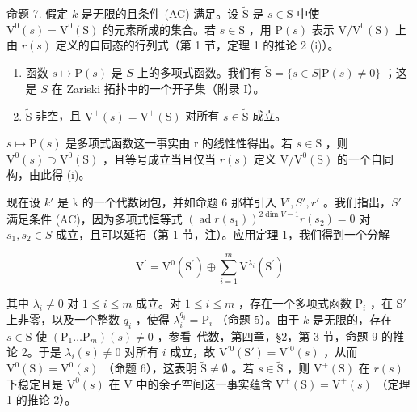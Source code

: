 命题 7. 假定 \(k\) 是无限的且条件 (AC) 满足。设 \(\tilde{\mathrm{S}}\) 是 \(s \in \mathrm{S}\) 中使 \(\mathrm{V}^0(s) = \mathrm{V}^0(\mathrm{S})\) 的元素所成的集合。若 \(s \in \mathrm{S}\) ，用 \(\mathrm{P}(s)\) 表示 \(\mathrm{V} / \mathrm{V}^0(\mathrm{S})\) 上由 \(r(s)\) 定义的自同态的行列式（第 1 节，定理 1 的推论 2 (i)）。

\begin{enumerate}
\def\labelenumi{(\roman{enumi})}
\item
  函数 \(s \mapsto \mathrm{P}(s)\) 是 \(S\) 上的多项式函数。我们有 \(\tilde{\mathrm{S}} = \{s \in S | \mathrm{P}(s) \neq 0\}\) ；这是 \(S\) 在 Zariski 拓扑中的一个开子集（附录 I）。
\item
  \(\tilde{\mathrm{S}}\) 非空，且 \(\mathrm{V}^{+}(s) = \mathrm{V}^{+}(\mathrm{S})\) 对所有 \(s\in \tilde{\mathrm{S}}\) 成立。
\end{enumerate}

\(s \mapsto \mathrm{P}(s)\) 是多项式函数这一事实由 r 的线性性得出。若 \(s \in \mathrm{S}\) ，则 \(\mathrm{V}^{0}(s) \supset \mathrm{V}^{0}(\mathrm{S})\) ，且等号成立当且仅当 \(r(s)\) 定义 \(\mathrm{V}/\mathrm{V}^{0}(\mathrm{S})\) 的一个自同构，由此得 (i)。

现在设 \(k'\) 是 k 的一个代数闭包，并如命题 6 那样引入 \(V', S', r'\) 。我们指出，\(S'\) 满足条件 (AC)，因为多项式恒等式 \((\operatorname{ad} r(s_1))^{2\dim V-1}r(s_2) = 0\) 对 \(s_1, s_2 \in S\) 成立，且可以延拓（第 1 节，注）。应用定理 1，我们得到一个分解

\[
\mathrm{V} ^ {\prime} = \mathrm{V} ^ {0} (\mathrm{S} ^ {\prime}) \oplus \sum_ {i = 1} ^ {m} \mathrm{V} ^ {\lambda_ {i}} (\mathrm{S} ^ {\prime})
\]

其中 \(\lambda_{i} \neq 0\) 对 \(1 \leq i \leq m\) 成立。对 \(1 \leq i \leq m\) ，存在一个多项式函数 \(\mathrm{P}_{i}\) ，在 \(\mathrm{S}'\) 上非零，以及一个整数 \(q_{i}\) ，使得 \(\lambda_{i}^{q_{i}} = \mathrm{P}_{i}\) （命题 5）。由于 \(k\) 是无限的，存在 \(s \in \mathrm{S}\) 使 \((\mathrm{P}_{1} \ldots \mathrm{P}_{m})(s) \neq 0\) ，参看~代数，第四章，§2，第 3 节，命题 9 的推论 2。于是 \(\lambda_{i}(s) \neq 0\) 对所有 \(i\) 成立，故 \(\mathrm{V}^{\prime 0}(\mathrm{S}') = \mathrm{V}^{\prime 0}(s)\) ，从而 \(\mathrm{V}^{0}(\mathrm{S}) = \mathrm{V}^{0}(s)\) （命题 6），这表明 \(\tilde{\mathrm{S}} \neq \emptyset\) 。若 \(s \in \tilde{\mathrm{S}}\) ，则 \(\mathrm{V}^{+}(\mathrm{S})\) 在 \(r(s)\) 下稳定且是 \(\mathrm{V}^{0}(s)\) 在 V 中的余子空间这一事实蕴含 \(\mathrm{V}^{+}(\mathrm{S}) = \mathrm{V}^{+}(s)\) （定理 1 的推论 2）。

